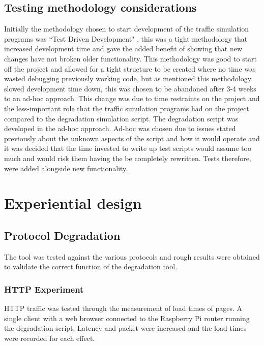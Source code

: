 \subsection{Testing methodology considerations}
Initially the methodology chosen to start development of the traffic simulation programs was ``Test Driven Development" \citep{beck2003test}, this was a tight methodology that increased development time and gave the added benefit of showing that new changes have not broken older functionality. This methodology was good to start off the project and allowed for a tight structure to be created where no time was wasted debugging previously working code, but as mentioned this methodology slowed development time down, this was chosen to be abandoned after 3-4 weeks to an ad-hoc approach. 
This change was due to time restraints on the project and the less-important role that the traffic simulation programs had on the project compared to the degradation simulation script. The degradation script was developed in the ad-hoc approach. Ad-hoc was chosen due to issues stated previously about the unknown aspects of the script and how it would operate and it was decided that the time invested to write up test scripts would assume too much and would risk them having the be completely rewritten. Tests therefore, were added alongside new functionality.





%
\section{Experiential design}

\subsection{Protocol Degradation}
The tool was tested against the various protocols and rough results were obtained to validate the correct function of the degradation tool. 

\subsubsection{HTTP Experiment}
HTTP traffic was tested through the measurement of load times of pages. A single client with a web browser connected to the Raspberry Pi router running the degradation script. Latency and packet were increased and the load times were recorded for each effect. 

